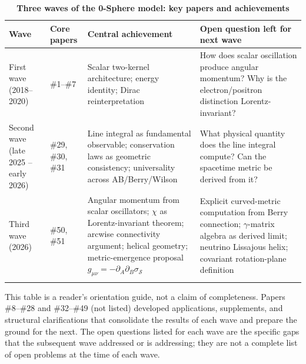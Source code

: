 \documentclass[%
 reprint, amsmath,amssymb, aps, prb, ]{revtex4-2}
\numberwithin{equation}{section}
\begin{document}
\begin{table}[t!]
\centering
\caption{\textbf{Three waves of the 0-Sphere model: key papers and achievements}}
\label{tab:threewaves}
\renewcommand{\arraystretch}{1.4}
\begin{tabular}{p{2.2cm}p{2.5cm}p{5.5cm}p{6.3cm}}
\toprule
\textbf{Wave} & \textbf{Core papers} & \textbf{Central achievement} & \textbf{Open question left for next wave} \\
\midrule
First wave \newline (2018--2020)
& \#1--\#7
& Scalar two-kernel architecture; energy identity; Dirac reinterpretation
& How does scalar oscillation produce angular momentum? Why is the electron/positron distinction Lorentz-invariant? \\
\addlinespace[0.3cm]
Second wave \newline (late 2025 -- early 2026)
& \#29, \#30, \#31
& Line integral as fundamental observable; conservation laws as geometric consistency; universality across AB/Berry/Wilson
& What physical quantity does the line integral compute? Can the spacetime metric be derived from it? \\
\addlinespace[0.3cm]
Third wave \newline (2026)
& \#50, \#51
& Angular momentum from scalar oscillators; $\chi$ as Lorentz-invariant theorem; arcwise connectivity argument; helical geometry; metric-emergence proposal $g_{\mu\nu} = -\partial_A\partial_B\sigma_{\mathcal{S}}$
& Explicit curved-metric computation from Berry connection; $\gamma$-matrix algebra as derived limit; neutrino Lissajous helix; covariant rotation-plane definition \\
\addlinespace[0.2cm]
\bottomrule
\end{tabular}
\vspace{0.2cm}
\begin{minipage}{0.95\textwidth}
\justifying\footnotesize
This table is a reader's orientation guide, not a claim of completeness. Papers \#8--\#28 and \#32--\#49 (not listed) developed applications, supplements, and structural clarifications that consolidate the results of each wave and prepare the ground for the next. The open questions listed for each wave are the specific gaps that the subsequent wave addressed or is addressing; they are not a complete list of open problems at the time of each wave.
\end{minipage}
\end{table}

\end{document}
